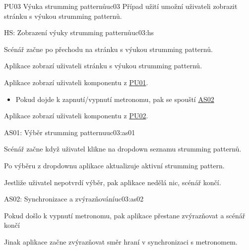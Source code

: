\begin{usecase}{PU03 Výuka strumming patternů}{uc03}
    Případ užití umožní uživateli zobrazit stránku s výukou strumming patternů.

    \begin{scenario}{HS: Zobrazení výuky strumming patternů}{uc03:hs}
        \item Scénář začne po přechodu na stránku s výukou strumming patternů.
        \item Aplikace zobrazí uživateli stránku s výukou strumming patternů.
        \item Aplikace zobrazí uživateli komponentu z \hyperref[uc01]{PU01}.
        \begin{itemize}
            \item Pokud dojde k zapnutí/vypnutí metronomu, pak se spouští \hyperref[uc3:as02]{AS02}
        \end{itemize}
        \item Aplikace zobrazí uživateli komponentu z \hyperref[uc02]{PU02}.
    \end{scenario}


    \begin{scenario}{AS01: Výběr strumming patternu}{uc03:as01}
        \item Scénář začne když uživatel klikne na dropdown seznamu strumming patternů.
        \item Po výběru z dropdownu aplikace aktualizuje aktivní strumming pattern.
        \item Jestliže uživatel nepotvrdí výběr, pak aplikace nedělá nic, scénář končí.

    \end{scenario}

    \begin{scenario}{AS02: Synchronizace a zvýrazňování}{uc03:as02}
        \item Pokud došlo k vypnutí metronomu, pak aplikace přestane zvýrazňovat a scénář končí
        \item Jinak aplikace začne zvýrazňovat směr hraní v synchronizaci s metronomem.
    \end{scenario}
\end{usecase}